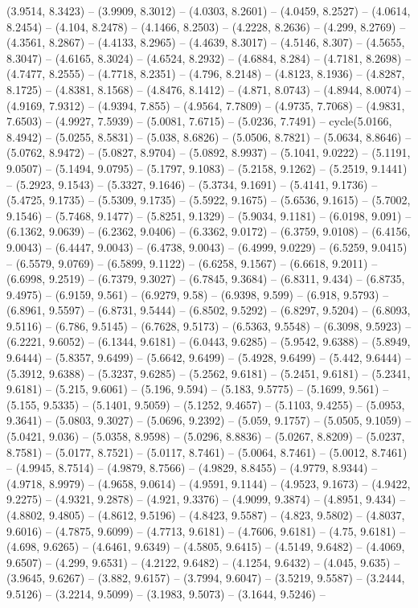(3.9514, 8.3423) -- (3.9909, 8.3012) -- (4.0303, 8.2601) -- (4.0459, 8.2527) -- (4.0614, 8.2454) -- (4.104, 8.2478) -- (4.1466, 8.2503) -- (4.2228, 8.2636) -- (4.299, 8.2769) -- (4.3561, 8.2867) -- (4.4133, 8.2965) -- (4.4639, 8.3017) -- (4.5146, 8.307) -- (4.5655, 8.3047) -- (4.6165, 8.3024) -- (4.6524, 8.2932) -- (4.6884, 8.284) -- (4.7181, 8.2698) -- (4.7477, 8.2555) -- (4.7718, 8.2351) -- (4.796, 8.2148) -- (4.8123, 8.1936) -- (4.8287, 8.1725) -- (4.8381, 8.1568) -- (4.8476, 8.1412) -- (4.871, 8.0743) -- (4.8944, 8.0074) -- (4.9169, 7.9312) -- (4.9394, 7.855) -- (4.9564, 7.7809) -- (4.9735, 7.7068) -- (4.9831, 7.6503) -- (4.9927, 7.5939) -- (5.0081, 7.6715) -- (5.0236, 7.7491) -- cycle(5.0166, 8.4942) -- (5.0255, 8.5831) -- (5.038, 8.6826) -- (5.0506, 8.7821) -- (5.0634, 8.8646) -- (5.0762, 8.9472) -- (5.0827, 8.9704) -- (5.0892, 8.9937) -- (5.1041, 9.0222) -- (5.1191, 9.0507) -- (5.1494, 9.0795) -- (5.1797, 9.1083) -- (5.2158, 9.1262) -- (5.2519, 9.1441) -- (5.2923, 9.1543) -- (5.3327, 9.1646) -- (5.3734, 9.1691) -- (5.4141, 9.1736) -- (5.4725, 9.1735) -- (5.5309, 9.1735) -- (5.5922, 9.1675) -- (5.6536, 9.1615) -- (5.7002, 9.1546) -- (5.7468, 9.1477) -- (5.8251, 9.1329) -- (5.9034, 9.1181) -- (6.0198, 9.091) -- (6.1362, 9.0639) -- (6.2362, 9.0406) -- (6.3362, 9.0172) -- (6.3759, 9.0108) -- (6.4156, 9.0043) -- (6.4447, 9.0043) -- (6.4738, 9.0043) -- (6.4999, 9.0229) -- (6.5259, 9.0415) -- (6.5579, 9.0769) -- (6.5899, 9.1122) -- (6.6258, 9.1567) -- (6.6618, 9.2011) -- (6.6998, 9.2519) -- (6.7379, 9.3027) -- (6.7845, 9.3684) -- (6.8311, 9.434) -- (6.8735, 9.4975) -- (6.9159, 9.561) -- (6.9279, 9.58) -- (6.9398, 9.599) -- (6.918, 9.5793) -- (6.8961, 9.5597) -- (6.8731, 9.5444) -- (6.8502, 9.5292) -- (6.8297, 9.5204) -- (6.8093, 9.5116) -- (6.786, 9.5145) -- (6.7628, 9.5173) -- (6.5363, 9.5548) -- (6.3098, 9.5923) -- (6.2221, 9.6052) -- (6.1344, 9.6181) -- (6.0443, 9.6285) -- (5.9542, 9.6388) -- (5.8949, 9.6444) -- (5.8357, 9.6499) -- (5.6642, 9.6499) -- (5.4928, 9.6499) -- (5.442, 9.6444) -- (5.3912, 9.6388) -- (5.3237, 9.6285) -- (5.2562, 9.6181) -- (5.2451, 9.6181) -- (5.2341, 9.6181) -- (5.215, 9.6061) -- (5.196, 9.594) -- (5.183, 9.5775) -- (5.1699, 9.561) -- (5.155, 9.5335) -- (5.1401, 9.5059) -- (5.1252, 9.4657) -- (5.1103, 9.4255) -- (5.0953, 9.3641) -- (5.0803, 9.3027) -- (5.0696, 9.2392) -- (5.059, 9.1757) -- (5.0505, 9.1059) -- (5.0421, 9.036) -- (5.0358, 8.9598) -- (5.0296, 8.8836) -- (5.0267, 8.8209) -- (5.0237, 8.7581) -- (5.0177, 8.7521) -- (5.0117, 8.7461) -- (5.0064, 8.7461) -- (5.0012, 8.7461) -- (4.9945, 8.7514) -- (4.9879, 8.7566) -- (4.9829, 8.8455) -- (4.9779, 8.9344) -- (4.9718, 8.9979) -- (4.9658, 9.0614) -- (4.9591, 9.1144) -- (4.9523, 9.1673) -- (4.9422, 9.2275) -- (4.9321, 9.2878) -- (4.921, 9.3376) -- (4.9099, 9.3874) -- (4.8951, 9.434) -- (4.8802, 9.4805) -- (4.8612, 9.5196) -- (4.8423, 9.5587) -- (4.823, 9.5802) -- (4.8037, 9.6016) -- (4.7875, 9.6099) -- (4.7713, 9.6181) -- (4.7606, 9.6181) -- (4.75, 9.6181) -- (4.698, 9.6265) -- (4.6461, 9.6349) -- (4.5805, 9.6415) -- (4.5149, 9.6482) -- (4.4069, 9.6507) -- (4.299, 9.6531) -- (4.2122, 9.6482) -- (4.1254, 9.6432) -- (4.045, 9.635) -- (3.9645, 9.6267) -- (3.882, 9.6157) -- (3.7994, 9.6047) -- (3.5219, 9.5587) -- (3.2444, 9.5126) -- (3.2214, 9.5099) -- (3.1983, 9.5073) -- (3.1644, 9.5246) -- 